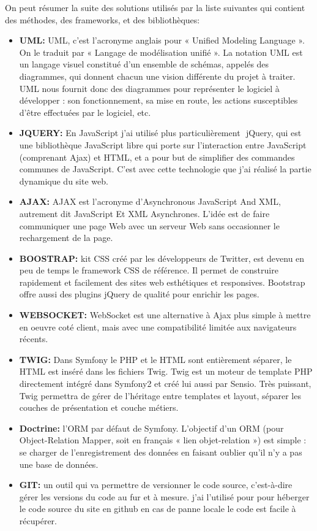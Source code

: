 \documentclass[12pt]{article}
\begin{document}
On peut résumer la suite des solutions utilisés  par la liste suivantes qui contient des méthodes, des frameworks, et des 
bibliothèques:
\begin{itemize}
\item \textbf{UML:} UML, c’est l’acronyme anglais pour « Unified Modeling Language ». On le traduit par « Langage de modélisation unifié ». La notation UML est un langage visuel constitué d’un ensemble de schémas, appelés des diagrammes, qui donnent chacun une vision différente du projet à traiter. UML nous fournit donc des diagrammes pour représenter le logiciel à développer : son fonctionnement, sa mise en route, les actions susceptibles d’être effectuées par le logiciel, etc.

\item \textbf{JQUERY:} En JavaScript j’ai utilisé plus particulièrement ​
jQuery, qui est une bibliothèque
JavaScript libre qui porte sur l'interaction entre JavaScript
(comprenant Ajax) et HTML, et a pour but de simplifier des
commandes
communes
de
JavaScript.
C’est
avec
cette
technologie que j’ai réalisé la partie dynamique du site web.

\item \textbf{AJAX:} AJAX est l'acronyme d'Asynchronous JavaScript And XML, autrement dit JavaScript Et XML Asynchrones.
L'idée  est de faire communiquer une page Web avec un serveur Web sans occasionner le rechargement de la page. 

\item \textbf{BOOSTRAP:} kit CSS créé par les développeurs de Twitter, est devenu en peu de temps le framework CSS de référence. Il permet de  construire rapidement et facilement des sites web esthétiques et responsives. Bootstrap offre aussi des plugins jQuery de qualité pour enrichir les pages.

\item \textbf{WEBSOCKET:} WebSocket est une alternative à Ajax plus simple à mettre en oeuvre coté client, mais avec une compatibilité limitée aux navigateurs récents.

\item \textbf{TWIG:} Dans Symfony le PHP et le HTML sont entièrement séparer, le HTML est inséré
dans les fichiers Twig. Twig est un moteur de template PHP
directement intégré dans Symfony2 et créé lui aussi par Sensio. Très
puissant, Twig permettra de gérer de l’héritage entre templates et
layout, séparer les couches de présentation et couche métiers.

\item \textbf{Doctrine: } l'ORM par défaut de Symfony. L'objectif d'un ORM (pour Object-Relation Mapper, soit en français « lien objet-relation ») est simple : se charger de l'enregistrement des données en  faisant oublier qu'il n'y a pas  une base de données.

\item \textbf{GIT:} un outil qui va  permettre de versionner le code source, c'est-à-dire gérer les versions du code au fur et à mesure. j'ai l'utilisé pour pour héberger le code source du site en github en cas de panne locale le
code est facile à récupérer.
\end{itemize}
\end{document}
